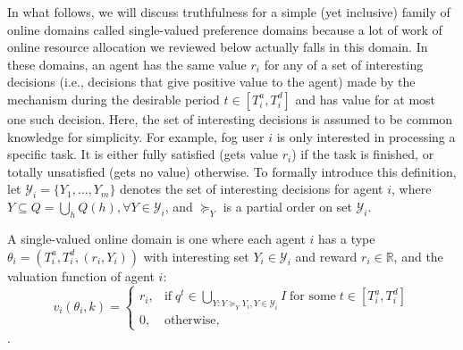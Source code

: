 \documentclass[11pt]{phdthesis}
\begin{document}
In what follows, we will discuss truthfulness for a simple (yet inclusive) family of online domains called single-valued preference domains because a lot of work of online resource allocation we reviewed below actually falls in this domain. In these domains, an agent has the same value $r_i$ for any of a set of interesting decisions (i.e., decisions that give positive value to the agent) made by the mechanism during the desirable period $t \in [T_i^a, T_i^d]$ and has value for at most one such decision. Here, the set of interesting decisions is assumed to be common knowledge for simplicity. For example, fog user $ i $ is only interested in processing a specific task. It is either fully satisfied (gets value $r_i$) if the task is finished, or totally unsatisfied (gets no value) otherwise. To formally introduce this definition, let $\mathcal{Y}_i = \{ Y_1,\ldots,Y_m\}$ denotes the set of interesting decisions for agent $i$, where $Y \subseteq Q = \bigcup_h Q(h), \forall Y \in \mathcal{Y}_i$, and $\succeq_Y$ is a partial order on set $\mathcal{Y}_i$.

\begin{definition}
	A single-valued online domain is one where each agent $i$ has a type $\theta_i = (T_i^a,T_i^d,(r_i, Y_i))$ with interesting set $Y_i \in \mathcal{Y}_i$ and reward $r_i \in \mathbb{R}$, and the valuation function of agent $i$:
	$$ v_i(\theta_i,k) =
	\begin{cases}
	r_i,& \text{if} \; q^t \in \bigcup_{Y:Y \succeq_Y Y_i, Y \in \mathcal{Y}_i} I \;\text{for some}\; t \in [T_i^a, T_i^d]\\
	0, & \text{otherwise},
	\end{cases}
	$$
	\citep[Definition 16.8]{nisan2007algorithmic}.
\end{definition}
\end{document}
